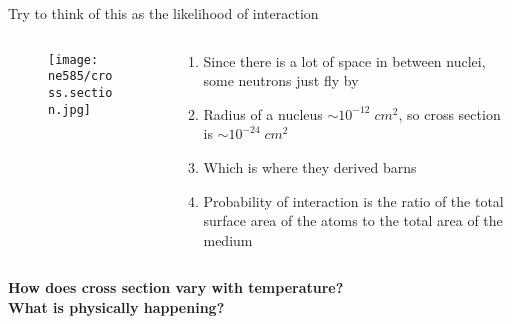 \documentclass[aspectratio=1610,pdftex,dvipsnames,compress,xcolor={dvipsnames}]{beamer}
\begin{document}
\begin{frame}{Try to think of this as the likelihood of interaction}
    \begin{columns}[t]

        \begin{column}{0.40\textwidth}
            \begin{figure}
                \centering
                \texttt{[image: ne585/cross.section.jpg]}
            \end{figure}
        \end{column}

        \begin{column}{0.60\textwidth}
            \begin{enumerate}[series=outerlist,topsep=0pt,itemsep=21pt,leftmargin=*,label=(\arabic*)]
                \item[]Since there is a lot of space in between nuclei, some neutrons just fly by
                \item[]Radius of a nucleus $\sim 10^{-12} \; cm^2$, so cross section is $\sim 10^{-24} \; cm^2$  
                \item[]Which is where they derived barns
                \item[]Probability of interaction is the ratio of the total surface area of the atoms to the total area of the medium
            \end{enumerate}
        \end{column}

    \end{columns}
\end{frame}


\begin{frame}[plain]{}
    \centering\Large\textbf{How does cross section vary with temperature?}\\
    \centering\small\textbf{What is physically happening?}
\end{frame}
\end{document}

